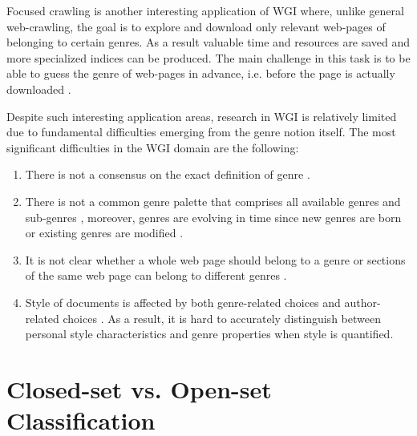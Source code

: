 Focused crawling is another interesting application of WGI where, unlike general web-crawling, the goal is to explore and download only relevant web-pages of belonging to certain genres. As a result valuable time and resources are saved and more specialized indices can be produced. The main challenge in this task is to be able to guess the genre of web-pages in advance, i.e. before the page is actually downloaded \parencite{priyatam2013don_URL}. 

Despite such interesting application areas, research in WGI is relatively limited due to fundamental difficulties emerging from the genre notion itself. The most significant difficulties in the WGI domain are the following:

\begin{enumerate}
\item There is not a consensus on the exact definition of genre \parencite{crowston2011problems}. 
\item There is not a common genre palette that comprises all available genres and sub-genres \parencite{santini2011cross,mehler2010genres_on_web,mason2009n,sharoff2010web}, moreover, genres are evolving in time since new genres are born or existing genres are modified \parencite{Boese2005}. 
\item It is not clear whether a whole web page should belong to a genre or sections of the same web page can belong to different genres \parencite{jebari2015combination,madjarov2015web}. 
\item Style of documents is affected by both genre-related choices and author-related choices \parencite{petrenz2011stable,Sharroff2010}. As a result, it is hard to accurately distinguish between personal style characteristics and genre properties when style is quantified.
\end{enumerate}

\section{Closed-set vs. Open-set Classification} \label{chap:introduction:sec:openset}

